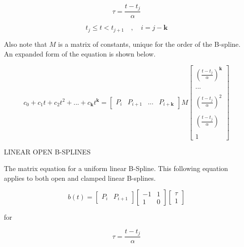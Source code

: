 \documentclass{article}
\begin{document}
    \begin{equation}
        \tau = \frac{t-t_j}{\alpha}
    \end{equation}
    
    \begin{equation}
        t_j \leq t < t_{j+1} \quad , \quad i = j-\textbf{k}
    \end{equation}
    
Also note that \(M\) is a matrix of constants, unique for the order of the B-spline. An expanded form of the equation is shown below.

\begin{equation}
    c_0 + c_1 t + c_2 t^2 + ... + c_{\textbf{k}} t^{\textbf{k}} = \begin{bmatrix} P_{i} & P_{i+1} & ... & P_{i+\textbf{k}}\end{bmatrix} M \begin{bmatrix} (\frac{t-t_j}{\alpha})^\textbf{k} \\ \\ ... \\ \\ (\frac{t-t_j}{\alpha})^2 \\ \\ (\frac{t-t_j}{\alpha}) \\ \\ 1 \end{bmatrix}
\end{equation}

LINEAR OPEN B-SPLINES
\hfill \break

    The matrix equation for a uniform linear B-Spline. This following equation applies to both open and clamped linear B-splines.
    
    \begin{equation}
        b(t) = \begin{bmatrix} P_i & P_{i+1} \end{bmatrix} \begin{bmatrix} -1 & 1 \\ 1 & 0
        \end{bmatrix} \begin{bmatrix} \tau \\ 1 \end{bmatrix}
    \end{equation}
    
    for
    
    \begin{equation}
        \tau = \frac{t-t_j}{\alpha}
    \end{equation}
    
\end{document}
